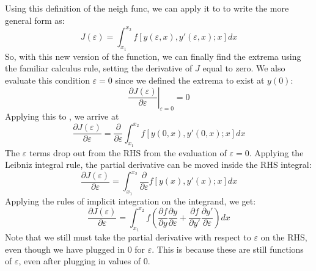Using this definition of the \gls{neigh func}, we can apply it to  to write the more general form as:
\begin{equation}\label{eq:neighborhood functional}
    J(\varepsilon)=\int_{x_1}^{x_2}f\left[y(\varepsilon,x),y'(\varepsilon,x);x\right]{dx}
\end{equation}
So, with this new version of the function, we can finally find the extrema using the familiar calculus rule, setting the derivative of $J$ equal to zero. We also evaluate this condition $\varepsilon=0$ since we defined the extrema to exist at $y(0)$:
\begin{equation}
    \left.\frac{\partial J(\varepsilon)}{\partial\varepsilon}\right\vert_{\varepsilon=0}=0
\end{equation}
Applying this to , we arrive at
\begin{equation}\label{eq:neighborhood functional diff}
    \frac{\partial J(\varepsilon)}{\partial\varepsilon}= \frac{\partial}{\partial\varepsilon}\int_{x_1}^{x_2}f\left[y(0,x),y'(0,x);x\right]{dx}
\end{equation}
The $\varepsilon$ terms drop out from the RHS from the evaluation of $\varepsilon=0$. Applying the Leibniz integral rule, the partial derivative can be moved inside the RHS integral:
\begin{equation}
    \frac{\partial J(\varepsilon)}{\partial\varepsilon}= \int_{x_1}^{x_2}\frac{\partial}{\partial\varepsilon}f\left[y(x),y'(x);x\right]{dx}
\end{equation}
Applying the rules of implicit integration on the integrand, we get:
\begin{equation}\label{eq:diff functional}
    \frac{\partial J(\varepsilon)}{\partial\varepsilon}= \int_{x_1}^{x_2}f\left(\frac{\partial f}{\partial y}\frac{\partial y}{\partial\varepsilon}+\frac{\partial f}{\partial y'}\frac{\partial y'}{\partial\varepsilon}\right){dx}
\end{equation}
Note that we still must take the partial derivative with respect to $\varepsilon$ on the RHS, even though we have plugged in 0 for $\varepsilon$. This is because these are still functions of $\varepsilon$, even after plugging in values of 0.

